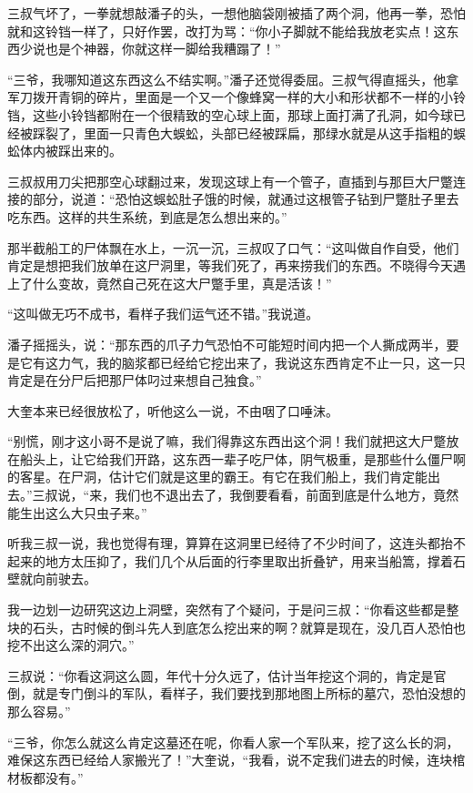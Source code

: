 三叔气坏了，一拳就想敲潘子的头，一想他脑袋刚被插了两个洞，他再一拳，恐怕就和这铃铛一样了，只好作罢，改打为骂：“你小子脚就不能给我放老实点！这东西少说也是个神器，你就这样一脚给我糟蹋了！”

“三爷，我哪知道这东西这么不结实啊。”潘子还觉得委屈。三叔气得直摇头，他拿军刀拨开青铜的碎片，里面是一个又一个像蜂窝一样的大小和形状都不一样的小铃铛，这些小铃铛都附在一个很精致的空心球上面，那球上面打满了孔洞，如今球已经被踩裂了，里面一只青色大蜈蚣，头部已经被踩扁，那绿水就是从这手指粗的蜈蚣体内被踩出来的。

三叔叔用刀尖把那空心球翻过来，发现这球上有一个管子，直插到与那巨大尸蹩连接的部分，说道：“恐怕这蜈蚣肚子饿的时候，就通过这根管子钻到尸蹩肚子里去吃东西。这样的共生系统，到底是怎么想出来的。”

那半截船工的尸体飘在水上，一沉一沉，三叔叹了口气：“这叫做自作自受，他们肯定是想把我们放单在这尸洞里，等我们死了，再来捞我们的东西。不晓得今天遇上了什么变故，竟然自己死在这大尸蹩手里，真是活该！”

“这叫做无巧不成书，看样子我们运气还不错。”我说道。

潘子摇摇头，说：“那东西的爪子力气恐怕不可能短时间内把一个人撕成两半，要是它有这力气，我的脑浆都已经给它挖出来了，我说这东西肯定不止一只，这一只肯定是在分尸后把那尸体叼过来想自己独食。”

大奎本来已经很放松了，听他这么一说，不由咽了口唾沫。

“别慌，刚才这小哥不是说了嘛，我们得靠这东西出这个洞！我们就把这大尸蹩放在船头上，让它给我们开路，这东西一辈子吃尸体，阴气极重，是那些什么僵尸啊的客星。在尸洞，估计它们就是这里的霸王。有它在我们船上，我们肯定能出去。”三叔说，“来，我们也不退出去了，我倒要看看，前面到底是什么地方，竟然能生出这么大只虫子来。”

听我三叔一说，我也觉得有理，算算在这洞里已经待了不少时间了，这连头都抬不起来的地方太压抑了，我们几个从后面的行李里取出折叠铲，用来当船篙，撑着石壁就向前驶去。

我一边划一边研究这边上洞壁，突然有了个疑问，于是问三叔：“你看这些都是整块的石头，古时候的倒斗先人到底怎么挖出来的啊？就算是现在，没几百人恐怕也挖不出这么深的洞穴。”

三叔说：“你看这洞这么圆，年代十分久远了，估计当年挖这个洞的，肯定是官倒，就是专门倒斗的军队，看样子，我们要找到那地图上所标的墓穴，恐怕没想的那么容易。”

“三爷，你怎么就这么肯定这墓还在呢，你看人家一个军队来，挖了这么长的洞，难保这东西已经给人家搬光了！”大奎说，“我看，说不定我们进去的时候，连块棺材板都没有。”


